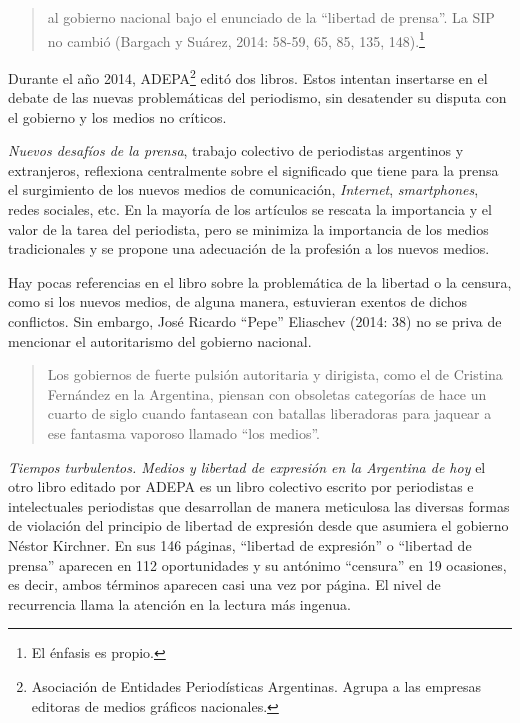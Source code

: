\begin{quote}
al gobierno nacional bajo el enunciado de la \enquote{libertad de prensa}. La SIP no cambió (Bargach y Suárez, 2014: 58-59, 65, 85, 135, 148).\footnote{El énfasis es propio.}
\end{quote}

Durante el año 2014, ADEPA\footnote{Asociación de Entidades Periodísticas Argentinas. Agrupa a las empresas editoras de medios gráficos nacionales.} editó dos libros. Estos intentan insertarse en el debate de las nuevas problemáticas del periodismo, sin desatender su disputa con el gobierno y los medios no críticos.

\emph{Nuevos desafíos de la prensa}, trabajo colectivo de periodistas argentinos y extranjeros, reflexiona centralmente sobre el significado que tiene para la prensa el surgimiento de los nuevos medios de comunicación, \emph{Internet}, \emph{smartphones}, redes sociales, etc. En la mayoría de los artículos se rescata la importancia y el valor de la tarea del periodista, pero se minimiza la importancia de los medios tradicionales y se propone una adecuación de la profesión a los nuevos medios.

Hay pocas referencias en el libro sobre la problemática de la libertad o la censura, como si los nuevos medios, de alguna manera, estuvieran exentos de dichos conflictos. Sin embargo, José Ricardo \enquote{Pepe} Eliaschev (2014: 38) no se priva de mencionar el autoritarismo del gobierno nacional.

\begin{quote}
Los gobiernos de fuerte pulsión autoritaria y dirigista, como el de Cristina Fernández en la Argentina, piensan con obsoletas categorías de hace un cuarto de siglo cuando fantasean con batallas liberadoras para jaquear a ese fantasma vaporoso llamado \enquote{los medios}.
\end{quote}

\emph{Tiempos turbulentos. Medios y libertad de expresión en la Argentina de hoy} el otro libro editado por ADEPA es un libro colectivo escrito por periodistas e intelectuales periodistas que desarrollan de manera meticulosa las diversas formas de violación del principio de libertad de expresión desde que asumiera el gobierno Néstor Kirchner. En sus 146 páginas, \enquote{libertad de expresión} o \enquote{libertad de prensa} aparecen en 112 oportunidades y su antónimo \enquote{censura} en 19 ocasiones, es decir, ambos términos aparecen casi una vez por página. El nivel de recurrencia llama la atención en la lectura más ingenua.

